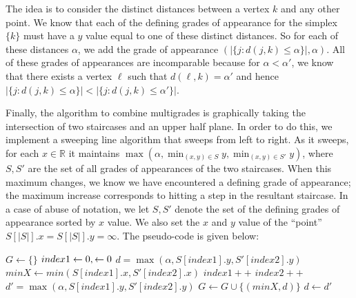 \documentclass[12pt]{amsart}
\theoremstyle{definition}
\theoremstyle{remark}
\newcommand{\R}{\mathbb{R}}
\begin{document}
The idea is to consider the distinct distances between a vertex $k$ and any other point. We know that each of the defining grades of appearance for the simplex $\{k\}$ must have a $y$ value equal to one of these distinct distances. So for each of these distances $\alpha$, we add the grade of appearance $(|\{j: d(j, k) \le \alpha\}|, \alpha)$. All of these grades of appearances are incomparable because for $\alpha < \alpha'$, we know that there exists a vertex $\ell$ such that $d(\ell, k) = \alpha'$ and hence $|\{j: d(j, k) \le \alpha\}| < |\{j: d(j, k) \le \alpha'\}|$.

Finally, the algorithm to combine multigrades is graphically taking the intersection of two staircases and an upper half plane. In order to do this, we implement a sweeping line algorithm that sweeps from left to right. As it sweeps, for each $x \in \R$ it maintains $\max(\alpha, \min_{(x, y) \in S} y, \min_{(x, y) \in S'} y)$, where $S, S'$ are the set of all grades of appearances of the two staircases. When this maximum changes, we know we have encountered a defining grade of appearance; the maximum increase corresponds to hitting a step in the resultant staircase. In a case of abuse of notation, we let $S, S'$ denote the set of the defining grades of appearance sorted by $x$ value. We also set the $x$ and $y$ value of the ``point'' $S[|S|].x = S[|S|].y = \infty$. The pseudo-code is given below:

\begin{algorithmic}
		\State $G \gets \{\}$
		\State $index1 \gets 0, \index2 \gets 0$
		\State $d = \max(\alpha, S[index1].y, S'[index2].y)$
			\State $minX \gets min(S[index1].x, S'[index2].x)$
				\State $index1++$
			\EndIf
				\State $index2++$
			\EndIf
			\State $d' = \max(\alpha, S[index1].y, S'[index2].y)$
				\State $G \gets G \cup \{(minX, d)\}$
				\State $d \gets d'$
			\EndIf
		\EndWhile
	\EndFunction
\end{algorithmic}
\end{document}
